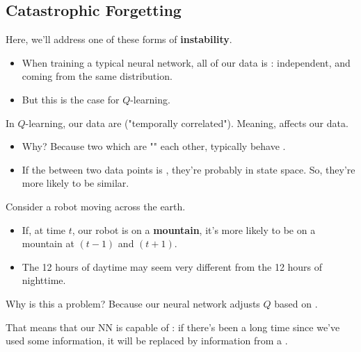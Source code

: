     \phantom{}

    \subsection{Catastrophic Forgetting}

        Here, we'll address one of these forms of \textbf{instability}.

        \begin{itemize}
            \item When training a typical neural network, all of our data is : independent, and coming from the same distribution.
            \item But this is  the case for $Q$-learning.\\
        \end{itemize}

        \begin{concept}
            In $Q$-learning, our data are  ("temporally correlated"). Meaning,  affects our data.

            \begin{itemize}
                \item Why? Because two  which are "" each other, typically behave .
                \item If the  between two data points is , they're probably  in state space. So, they're more likely to be similar.
            \end{itemize}
        \end{concept}

        \miniex Consider a robot moving across the earth.

        \begin{itemize}
            \item {} If, at time $t$, our robot is on a \textbf{mountain}, it's more likely to be on a mountain at $(t-1)$ and $(t+1)$.
            \item {} The 12 hours of daytime may seem very different from the 12 hours of nighttime.
        \end{itemize}

        Why is this a problem? Because our neural network adjusts $Q$ based on .

        That means that our NN is capable of : if there's been a long time since we've used some information, it will be replaced by information from a .\\

